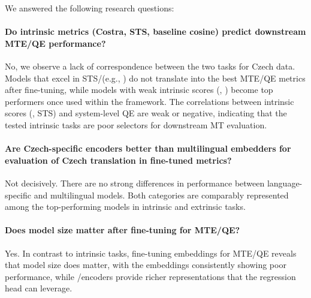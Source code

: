 \begin{mdframed}[
    linecolor=gray,
    linewidth=2pt,
    roundcorner=5,
    backgroundcolor=gray!5
]
\noindent
We answered the following research questions:

\paragraph{Do intrinsic metrics (Costra, STS, baseline cosine) predict downstream MTE/QE performance?}
No, we observe a lack of correspondence between the two tasks for Czech data. Models that excel in STS/\costra (e.g., \simcse) do not translate into the best MTE/QE metrics after fine-tuning, while models with weak intrinsic scores (\xlmr, \hbox{\fernet{}}) become top performers once used within the \comet framework. The correlations between intrinsic scores (\costraminus, STS) and system-level QE are weak or negative, indicating that the tested intrinsic tasks are poor selectors for downstream MT evaluation.

\paragraph{Are Czech-specific encoders better than multilingual embedders for evaluation of Czech translation in fine-tuned \comet metrics?}
Not decisively. There are no strong differences in performance between language-specific and multilingual models. Both categories are comparably represented among the top-performing models in intrinsic and extrinsic tasks.
    
\paragraph{Does model size matter after fine-tuning for MTE/QE?}
Yes. In contrast to intrinsic tasks, fine-tuning embeddings for MTE/QE reveals that model size does matter, with the \Small embeddings consistently showing poor performance, while \Base/\LargeSize encoders provide richer representations that the regression head can leverage. 
   

\end{mdframed}
